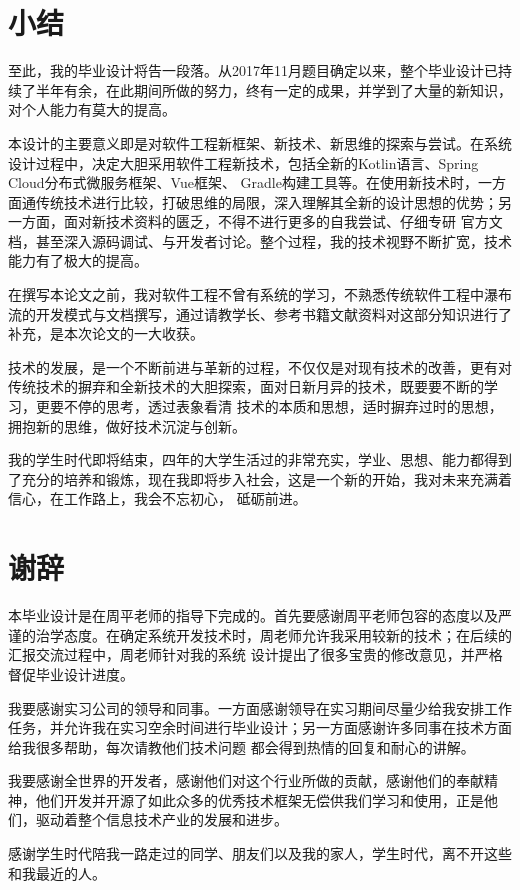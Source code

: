 \documentclass[titlepage,UTF8,linespread=1.5]{ctexart}
\begin{document}
\section{小结}
至此，我的毕业设计将告一段落。从2017年11月题目确定以来，整个毕业设计已持续了半年有余，在此期间所做的努力，终有一定的成果，并学到了大量的新知识，对个人能力有莫大的提高。\par
本设计的主要意义即是对软件工程新框架、新技术、新思维的探索与尝试。在系统设计过程中，决定大胆采用软件工程新技术，包括全新的Kotlin语言、Spring Cloud分布式微服务框架、Vue框架、
Gradle构建工具等。在使用新技术时，一方面通传统技术进行比较，打破思维的局限，深入理解其全新的设计思想的优势；另一方面，面对新技术资料的匮乏，不得不进行更多的自我尝试、仔细专研
官方文档，甚至深入源码调试、与开发者讨论。整个过程，我的技术视野不断扩宽，技术能力有了极大的提高。\par
在撰写本论文之前，我对软件工程不曾有系统的学习，不熟悉传统软件工程中瀑布流的开发模式与文档撰写，通过请教学长、参考书籍文献资料对这部分知识进行了补充，是本次论文的一大收获。\par
技术的发展，是一个不断前进与革新的过程，不仅仅是对现有技术的改善，更有对传统技术的摒弃和全新技术的大胆探索，面对日新月异的技术，既要要不断的学习，更要不停的思考，透过表象看清
技术的本质和思想，适时摒弃过时的思想，拥抱新的思维，做好技术沉淀与创新。\par
我的学生时代即将结束，四年的大学生活过的非常充实，学业、思想、能力都得到了充分的培养和锻炼，现在我即将步入社会，这是一个新的开始，我对未来充满着信心，在工作路上，我会不忘初心，
砥砺前进。\par
\clearpage

\section*{谢辞}
本毕业设计是在周平老师的指导下完成的。首先要感谢周平老师包容的态度以及严谨的治学态度。在确定系统开发技术时，周老师允许我采用较新的技术；在后续的汇报交流过程中，周老师针对我的系统
设计提出了很多宝贵的修改意见，并严格督促毕业设计进度。\par
我要感谢实习公司的领导和同事。一方面感谢领导在实习期间尽量少给我安排工作任务，并允许我在实习空余时间进行毕业设计；另一方面感谢许多同事在技术方面给我很多帮助，每次请教他们技术问题
都会得到热情的回复和耐心的讲解。\par
我要感谢全世界的开发者，感谢他们对这个行业所做的贡献，感谢他们的奉献精神，他们开发并开源了如此众多的优秀技术框架无偿供我们学习和使用，正是他们，驱动着整个信息技术产业的发展和进步。\par
感谢学生时代陪我一路走过的同学、朋友们以及我的家人，学生时代，离不开这些和我最近的人。\par
\clearpage
\end{document}
